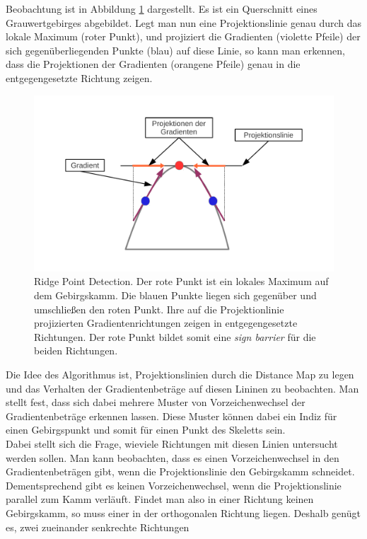 Beobachtung ist in Abbildung \ref{fig:paper_ridge_point_detection} dargestellt. Es ist ein Querschnitt eines Grauwertgebirges
abgebildet. Legt man nun eine Projektionslinie genau durch das lokale Maximum (roter Punkt), und projiziert die Gradienten (violette Pfeile) der sich gegenüberliegenden Punkte (blau) auf diese Linie, so kann man erkennen, dass die Projektionen der Gradienten (orangene Pfeile) genau in die entgegengesetzte Richtung zeigen.
\begin{figure}[ht]
\centering
\includegraphics[width=1.0\linewidth]{./fig/paper_ridge_point_detection.pdf}
\caption{Ridge Point Detection. Der rote Punkt ist ein lokales Maximum auf dem Gebirgskamm. Die blauen Punkte liegen sich
gegenüber und umschließen den roten Punkt. Ihre auf die Projektionlinie projizierten Gradientenrichtungen zeigen in entgegengesetzte Richtungen. Der rote Punkt bildet somit eine \emph{sign barrier} für die beiden Richtungen.}
\label{fig:paper_ridge_point_detection}
\end{figure}
\FloatBarrier
\noindent
Die Idee des Algorithmus ist, Projektionslinien durch die Distance Map zu legen und das Verhalten der Gradientenbeträge
auf diesen Lininen zu beobachten. Man stellt fest, dass sich dabei mehrere Muster von Vorzeichenwechsel der
Gradientenbeträge erkennen lassen. Diese Muster können dabei ein Indiz für einen Gebirgspunkt und somit für einen Punkt des Skeletts sein. \\
Dabei stellt sich die Frage, wieviele Richtungen mit diesen Linien untersucht werden sollen. Man kann beobachten, dass es
einen Vorzeichenwechsel in den Gradientenbeträgen gibt, wenn die Projektionslinie den Gebirgskamm schneidet. Dementsprechend 
gibt es keinen Vorzeichenwechsel, wenn die Projektionslinie parallel zum Kamm verläuft. Findet man also in einer Richtung
keinen Gebirgskamm, so muss einer in der orthogonalen Richtung liegen. Deshalb genügt es, zwei zueinander senkrechte Richtungen
